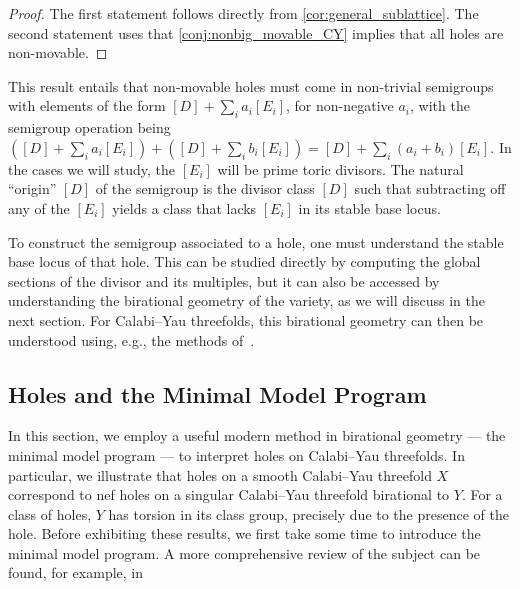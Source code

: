\documentclass[11pt,dvipsnames]{article}
\theoremstyle{definition}
\begin{document}
\begin{proof}
    The first statement follows directly from \cref{cor:general_sublattice}. The second statement uses that \cref{conj:nonbig_movable_CY} implies that all holes are non-movable.
\end{proof}
This result entails that non-movable holes must come in non-trivial semigroups with elements of the form $[D] + \sum_i a_i [E_i]$, for non-negative $a_i$, with the semigroup operation being $([D] + \sum_i a_i [E_i]) + ([D] + \sum_i b_i [E_i]) = [D] + \sum_i (a_i + b_i)[E_i]$. In the cases we will study, the $[E_i]$ will be prime toric divisors. The natural ``origin'' $[D]$ of the semigroup is the divisor class $[D]$ such that subtracting off any of the $[E_i]$ yields a class that lacks $[E_i]$ in its stable base locus.

To construct the semigroup associated to a hole, one must understand the stable base locus of that hole. This can be studied directly by computing the global sections of the divisor and its multiples, but it can also be accessed by understanding the birational geometry of the variety, as we will discuss in the next section. For Calabi--Yau threefolds, this birational geometry can then be understood using, e.g., the methods of~\cite{Gendler:2022ztv}.

\subsection{Holes and the Minimal Model Program}

\label{sec:minimal_model}

In this section, we employ a useful modern method in birational geometry --- the minimal model program --- to interpret holes on Calabi--Yau threefolds. In particular, we illustrate that holes on a smooth Calabi--Yau threefold $X$ correspond to nef holes on a singular Calabi--Yau threefold birational to $Y$. For a class of holes, $Y$ has torsion in its class group, precisely due to the presence of the hole. Before exhibiting these results, we first take some time to introduce the minimal model program. A more comprehensive review of the subject can be found, for example, in \cite{KM}
\end{document}
